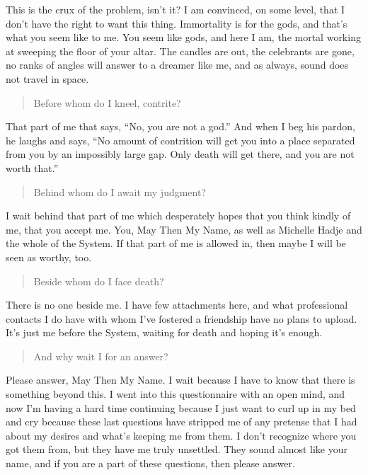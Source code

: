 This is the crux of the problem, isn't it? I am convinced, on some level, that I don't have the right to want this thing. Immortality is for the gods, and that's what you seem like to me. You seem like gods, and here I am, the mortal working at sweeping the floor of your altar. The candles are out, the celebrants are gone, no ranks of angles will answer to a dreamer like me, and as always, sound does not travel in space.

\begin{quote}
Before whom do I kneel, contrite?
\end{quote}

That part of me that says, ``No, you are not a god.'' And when I beg his pardon, he laughs and says, ``No amount of contrition will get you into a place separated from you by an impossibly large gap. Only death will get there, and you are not worth that.''

\begin{quote}
Behind whom do I await my judgment?
\end{quote}

I wait behind that part of me which desperately hopes that you think kindly of me, that you accept me. You, May Then My Name, as well as Michelle Hadje and the whole of the System. If that part of me is allowed in, then maybe I will be seen as worthy, too.

\begin{quote}
Beside whom do I face death?
\end{quote}

There is no one beside me. I have few attachments here, and what professional contacts I do have with whom I've fostered a friendship have no plans to upload. It's just me before the System, waiting for death and hoping it's enough.

\begin{quote}
And why wait I for an answer?
\end{quote}

Please answer, May Then My Name. I wait because I have to know that there is something beyond this. I went into this questionnaire with an open mind, and now I'm having a hard time continuing because I just want to curl up in my bed and cry because these last questions have stripped me of any pretense that I had about my desires and what's keeping me from them. I don't recognize where you got them from, but they have me truly unsettled. They sound almost like your name, and if you are a part of these questions, then please answer.

